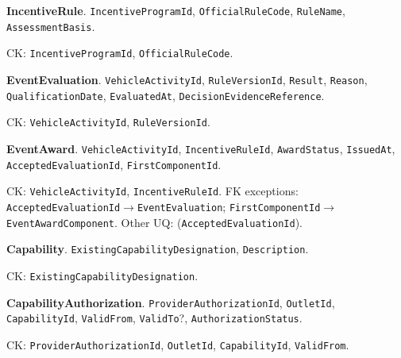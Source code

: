 \par\vspace{2.0pt}\noindent\textbf{IncentiveRule}. \texttt{Incentive\allowbreak{}Program\allowbreak{}Id}, \texttt{Official\allowbreak{}Rule\allowbreak{}Code}, \texttt{Rule\allowbreak{}Name}, \texttt{Assessment\allowbreak{}Basis}.\par\noindent CK: \texttt{Incentive\allowbreak{}Program\allowbreak{}Id}, \texttt{Official\allowbreak{}Rule\allowbreak{}Code}.
\par\vspace{2.0pt}\noindent\textbf{EventEvaluation}. \texttt{Vehicle\allowbreak{}Activity\allowbreak{}Id}, \texttt{Rule\allowbreak{}Version\allowbreak{}Id}, \texttt{Result}, \texttt{Reason}, \texttt{Qualification\allowbreak{}Date}, \texttt{Evaluated\allowbreak{}At}, \texttt{Decision\allowbreak{}Evidence\allowbreak{}Reference}.\par\noindent CK: \texttt{Vehicle\allowbreak{}Activity\allowbreak{}Id}, \texttt{Rule\allowbreak{}Version\allowbreak{}Id}.
\par\vspace{2.0pt}\noindent\textbf{EventAward}. \texttt{Vehicle\allowbreak{}Activity\allowbreak{}Id}, \texttt{Incentive\allowbreak{}Rule\allowbreak{}Id}, \texttt{Award\allowbreak{}Status}, \texttt{Issued\allowbreak{}At}, \texttt{Accepted\allowbreak{}Evaluation\allowbreak{}Id}, \texttt{First\allowbreak{}Component\allowbreak{}Id}.\par\noindent CK: \texttt{Vehicle\allowbreak{}Activity\allowbreak{}Id}, \texttt{Incentive\allowbreak{}Rule\allowbreak{}Id}. FK exceptions: \texttt{Accepted\allowbreak{}Evaluation\allowbreak{}Id}$\to$\texttt{Event\allowbreak{}Evaluation}; \texttt{First\allowbreak{}Component\allowbreak{}Id}$\to$\texttt{Event\allowbreak{}Award\allowbreak{}Component}. Other UQ: (\texttt{Accepted\allowbreak{}Evaluation\allowbreak{}Id}).
\par\vspace{2.0pt}\noindent\textbf{Capability}. \texttt{Existing\allowbreak{}Capability\allowbreak{}Designation}, \texttt{Description}.\par\noindent CK: \texttt{Existing\allowbreak{}Capability\allowbreak{}Designation}.
\par\vspace{2.0pt}\noindent\textbf{CapabilityAuthorization}. \texttt{Provider\allowbreak{}Authorization\allowbreak{}Id}, \texttt{Outlet\allowbreak{}Id}, \texttt{Capability\allowbreak{}Id}, \texttt{Valid\allowbreak{}From}, \texttt{Valid\allowbreak{}To}?, \texttt{Authorization\allowbreak{}Status}.\par\noindent CK: \texttt{Provider\allowbreak{}Authorization\allowbreak{}Id}, \texttt{Outlet\allowbreak{}Id}, \texttt{Capability\allowbreak{}Id}, \texttt{Valid\allowbreak{}From}.
